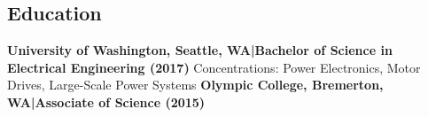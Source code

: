 \documentclass[]{article}
\begin{document}
\begin{singlespace}
\section*{Education}

\textbf{University of Washington, Seattle, WA\hspace{3 mm}|\hspace{3 mm}Bachelor of Science in Electrical Engineering (2017)}
\newline Concentrations: Power Electronics, Motor Drives, Large-Scale Power Systems
\newline\break\textbf{Olympic College, Bremerton, WA\hspace{3 mm}|\hspace{3 mm}Associate of Science (2015)}

\end{singlespace}
\end{document}
